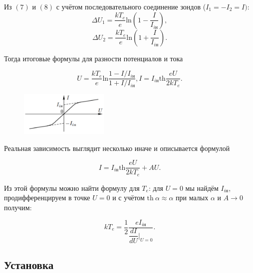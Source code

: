 \documentclass[a4paper]{article}
\theoremstyle{definition}
\theoremstyle{remark}
\begin{document}
Из $(7)$ и $(8)$ с учётом последовательного соединение зондов ($I_1 = -I_2 = I)$:
$$\Delta U_1= \dfrac{kT_e}{e}\text{ln}\left(1 - \dfrac{I}{I_{i\text{н}}}\right),$$
$$\Delta U_2= \dfrac{kT_e}{e}\text{ln}\left(1 + \dfrac{I}{I_{i\text{н}}}\right).$$

Тогда итоговые формулы для разности потенциалов и тока

\begin{equation}
    U = \dfrac{kT_e}{e}\text{ln}\dfrac{1 - I/I_{i\text{н}}}{1 + I/I_{i\text{н}}}, 
    I = I_{i\text{н}} \text{th}\dfrac{eU}{2kT_e}.
\end{equation}

\begin{figure}
    \centering
    \includegraphics[width = 120pt]{image/third.png}
\end{figure} 

Реальная зависимость выглядит несколько иначе и описывается формулой 

\begin{equation}
    I = I_{i\text{н}} \text{th}\dfrac{eU}{2kT_e} + AU.
\end{equation}

Из этой формулы можно найти формулу для $T_e$: для $U=0$ мы найдём $I_{i\text{н}}$, продифференцируем в точке $U=0$ и с учётом $\text{th}~\alpha \approx \alpha$ при малых $\alpha$ и $A\rightarrow 0$ получим:

\begin{equation}
    kT_e = \dfrac{1}{2}\dfrac{eI_{i\text{н}}}{\dfrac{dI}{dU}|_{U=0}}.
\end{equation}

\subsection{Установка}
\end{document}
